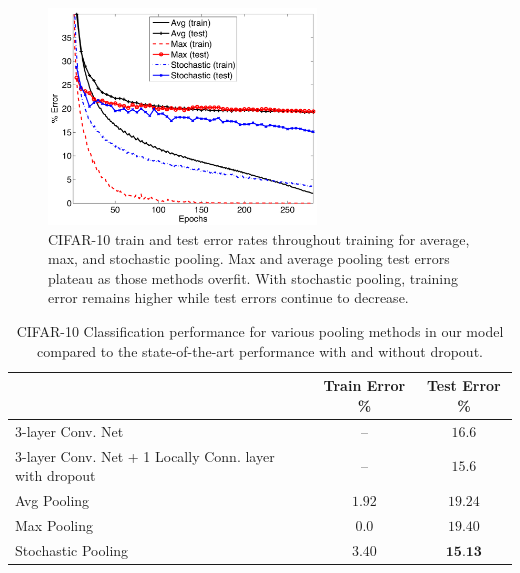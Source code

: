 \documentclass{article} %
\begin{document}
\begin{figure}[t!]
\vspace*{-0.3cm}
\begin{center}
\includegraphics[width=2.8in]{CIFAR_errors.pdf}
\end{center}
\vspace*{-0.6cm}
\caption{CIFAR-10 train and test error rates throughout training for
  average, max, and stochastic pooling. Max and average pooling test
  errors plateau as those methods overfit. With stochastic pooling,
  training error remains higher while test errors continue to
  decrease.\footnotemark[1]}
\label{fig:cifar}
\vspace*{-0.3cm}
\end{figure}



\begin{table}[h!]
\small
\vspace*{-2mm}
\begin{center}
\begin{tabular}{|l|c|c|}
  \hline
  & Train Error \% & Test Error \% \\
  \hline 3-layer Conv. Net  \cite{Hinton12} & -- & $16.6$ \\
  \hline 3-layer Conv. Net + 1 Locally Conn. layer with dropout \cite{Hinton12} & -- & $15.6$ \\
  \hline \hline %
  Avg Pooling & $1.92$ & $19.24$ \\
   \hline %
  Max Pooling & $0.0$ & $19.40$ \\
   \hline %
  Stochastic Pooling & $3.40$ & $\textbf{15.13}$ \\
   \hline
\end{tabular}
\vspace*{-2mm}
\caption{CIFAR-10 Classification performance for various pooling
  methods in our model compared to the state-of-the-art performance
  \cite{Hinton12} with and without dropout.}
\label{tab:cifar}
\vspace*{-2mm}
\end{center}
\end{table}
\end{document}
